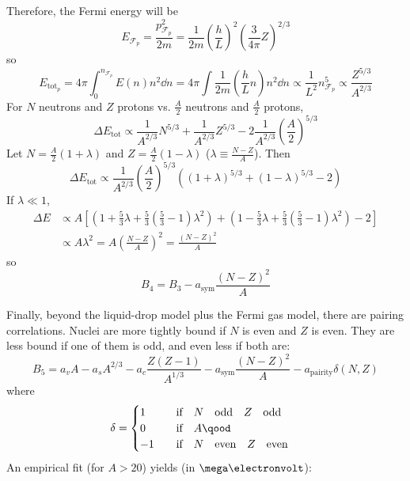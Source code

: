 \documentclass[a4paper,twoside,master.tex]{subfiles}
\begin{document}
Therefore, the Fermi energy will be
\begin{equation}
    E_{\mathcal{F}_p} = \frac{p^2_{\mathcal{F}_p}}{2m} = \frac{1}{2m} \left( \frac{h}{L} \right)^2 \left( \frac{3}{4 \pi} Z \right)^{2/3}
\end{equation}
so
\begin{equation}
    E_{\text{tot}_p} = 4 \pi \int_0^{n_{\mathcal{F}_p}} E(n) n^2 \dd{n} = 4 \pi \int \frac{1}{2m} \left( \frac{h}{L} n \right) n^2 \dd{n} \propto \frac{1}{L^2} n^5_{\mathcal{F}_p} \propto \frac{Z^{5/3}}{A^{2/3}}
\end{equation}
For $ N $ neutrons and $ Z $ protons vs. $ \frac{A}{2} $ neutrons and $ \frac{A}{2} $ protons,
\begin{equation}
    \Delta E_{\text{tot}} \propto \frac{1}{A^{2/3}} N^{5/3} + \frac{1}{A^{2/3}} Z^{5/3} - 2 \frac{1}{A^{2/3}} \left( \frac{A}{2} \right)^{5/3}
\end{equation}
Let $ N = \frac{A}{2} (1 + \lambda) $ and $ Z = \frac{A}{2} (1 - \lambda) $ ($ \lambda \equiv \frac{N - Z}{A} $). Then
\begin{equation}
    \Delta E_{\text{tot}} \propto \frac{1}{A^{2/3}} \left( \frac{A}{2} \right)^{5/3} \left( (1 + \lambda)^{5/3} + (1 - \lambda)^{5/3} - 2 \right)
\end{equation}
If $ \lambda \ll 1 $,
\begin{align}
    \Delta E &\propto A \left[ \left( 1 + \frac{5}{3} \lambda + \frac{5}{3} \left( \frac{5}{3} - 1 \right) \lambda^2 \right) + \left( 1 - \frac{5}{3} \lambda + \frac{5}{3} \left( \frac{5}{3} - 1 \right) \lambda^2 \right) - 2 \right] \\
    &\propto A \lambda^2 = A \left( \frac{N - Z}{A} \right)^2 = \frac{(N - Z)^2}{A}
\end{align}
so
\begin{equation}
    B_4 = B_3 - a_{\text{sym}} \frac{(N - Z)^2}{A}
\end{equation}

Finally, beyond the liquid-drop model plus the Fermi gas model, there are pairing correlations. Nuclei are more tightly bound if $ N $ is even and $ Z $ is even. They are less bound if one of them is odd, and even less if both are:
\begin{equation}
    B_5 = a_v A - a_s A^{2/3} - a_c \frac{Z(Z-1)}{A^{1/3}} - a_{\text{sym}} \frac{(N - Z)^2}{A} - a_{\text{pairity}} \delta(N,Z)
\end{equation}
where
\begin{equation}
    \delta = \begin{cases} 1& \qif N \qodd Z \qodd \\ 0&\qif A\qood\\ -1&\qif N\qeven Z\qeven \end{cases}
\end{equation}
An empirical fit (for $ A > 20 $) yields (in $ \mega\electronvolt $):
\end{document}

